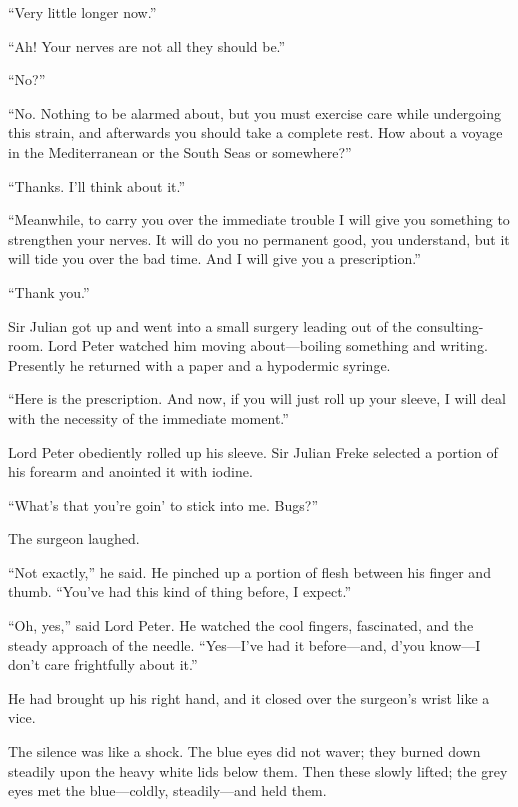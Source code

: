 \enquote{Very little longer now.}

\enquote{Ah! Your nerves are not all they should be.}

\enquote{No?}

\enquote{No. Nothing to be alarmed about, but you must exercise care while undergoing this strain, and afterwards you should take a complete rest. How about a voyage in the Mediterranean or the South Seas or somewhere?}

\enquote{Thanks. I’ll think about it.}

\enquote{Meanwhile, to carry you over the immediate trouble I will give you something to strengthen your nerves. It will do you no permanent good, you understand, but it will tide you over the bad time. And I will give you a prescription.}

\enquote{Thank you.}

Sir Julian got up and went into a small surgery leading out of the consulting-room. Lord Peter watched him moving about\allowbreak---\allowbreak boiling something and writing. Presently he returned with a paper and a hypodermic syringe.

\enquote{Here is the prescription. And now, if you will just roll up your sleeve, I will deal with the necessity of the immediate moment.}

Lord Peter obediently rolled up his sleeve. Sir Julian Freke selected a portion of his forearm and anointed it with iodine.

\enquote{What’s that you’re goin’ to stick into me. Bugs?}

The surgeon laughed.

\enquote{Not exactly,} he said. He pinched up a portion of flesh between his finger and thumb. \enquote{You’ve had this kind of thing before, I expect.}

\enquote{Oh, yes,} said Lord Peter. He watched the cool fingers, fascinated, and the steady approach of the needle. \enquote{Yes\allowbreak---\allowbreak I’ve had it before\allowbreak---\allowbreak and, d’you know\allowbreak---\allowbreak I don’t care frightfully about it.}

He had brought up his right hand, and it closed over the surgeon’s wrist like a vice.

The silence was like a shock. The blue eyes did not waver; they burned down steadily upon the heavy white lids below them. Then these slowly lifted; the grey eyes met the blue\allowbreak---\allowbreak coldly, steadily\allowbreak---\allowbreak and held them.

